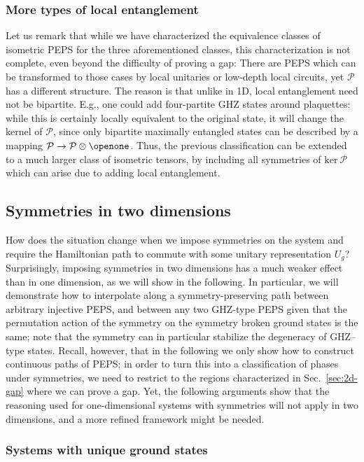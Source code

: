 \documentclass[twocolumn,superscriptaddress,prb,linenumbers]{revtex4-1}
\newcommand{\mc}[1]{\mathcal{#1}}
\begin{document}
\subsubsection{More types of local entanglement}

Let us remark that while we have characterized the equivalence classes of
isometric PEPS for the three aforementioned classes, this characterization
is not complete, even beyond the difficulty of proving a gap: There are
PEPS which can be transformed to those cases by local unitaries or
low-depth local circuits, yet $\mc
    P$ has a different structure. The reason is that unlike in
1D, local entanglement need not be bipartite. E.g., one could add
four-partite GHZ states around plaquettes: while this is certainly
locally equivalent to the original state, it will change the kernel of
$\mc P$, since only bipartite maximally entangled states can be described
by a mapping $\mc P\rightarrow \mc P\otimes \openone$. Thus, the previous
classification can be extended to a much larger class of isometric
tensors, by including all symmetries of $\mathrm{ker}\:\mc P$ which can
arise due to adding local entanglement.


\subsection{Symmetries in two dimensions
    \label{sec:2d-sym}}

How does the situation change when we impose symmetries on the system and
require the Hamiltonian path to commute with some unitary representation
$U_g$? Surprisingly, imposing symmetries in two dimensions has a much
weaker effect than in one dimension, as we will show in the following. In
particular, we will demonstrate how to interpolate along a
symmetry-preserving path between arbitrary injective PEPS,  and between
any two GHZ-type PEPS given that the permutation action of the symmetry on
the symmetry broken ground states is the same; note that the symmetry can
in particular stabilize the degeneracy of GHZ--type states. Recall,
however, that in the following we only show how to construct continuous
paths of PEPS; in order to turn this into a classification of phases under
symmetries, we need to restrict to the regions characterized in
Sec.~\ref{sec:2d-gap} where we can prove a gap.  Yet, the following
arguments show that the reasoning used for one-dimensional systems with
symmetries will not apply in two dimensions, and a more refined framework
might be needed.

\subsubsection{Systems with unique ground states}
\end{document}
